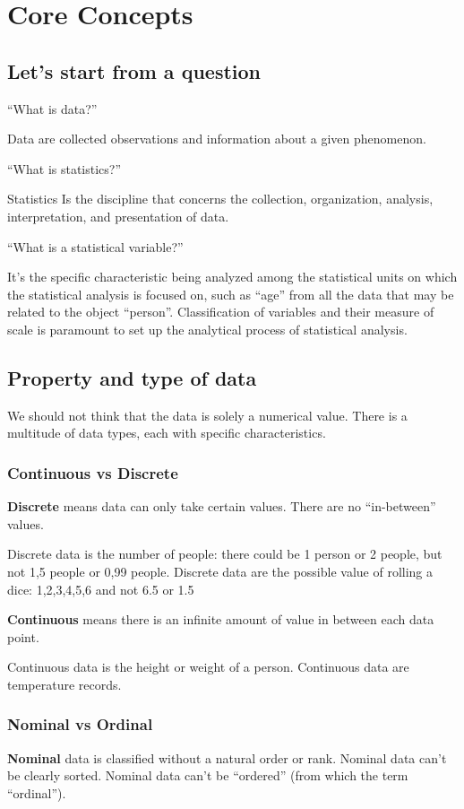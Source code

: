 \documentclass{article}
\begin{document}
\clearpage

\section{Core Concepts}
\subsection{Let's start from a question}
“What is data?”

Data are collected observations and information about a given phenomenon.

“What is statistics?”

Statistics Is the discipline that concerns the collection, organization, analysis, interpretation, and presentation of data.

“What is a statistical variable?”

It’s the specific characteristic being analyzed among the statistical units on which the statistical analysis is focused on, such as “age” from all the data that may be related to the object “person”. Classification of variables and their measure of scale is paramount to set up the analytical process of statistical analysis. 

\subsection{Property and type of data}

We should not think that the data is solely a numerical value. There is a multitude of data types, each with specific characteristics. 

\subsubsection{Continuous vs Discrete}
\textbf{Discrete} means data can only take certain values. There are no “in-between” values. 

Discrete data is the number of people: there could be 1 person or 2 people, but not 1,5 people or 0,99 people. 
Discrete data are the possible value of rolling a dice: 1,2,3,4,5,6 and not 6.5 or 1.5

\textbf{Continuous} means there is an infinite amount of value in between each data point.

Continuous data is the height or weight of a person.
Continuous data are temperature records. 
 
\subsubsection{Nominal vs Ordinal}
\textbf{Nominal} data is classified without a natural order or rank. Nominal data can’t be clearly sorted. 
Nominal data can’t be “ordered” (from which the term “ordinal”).
\end{document}
